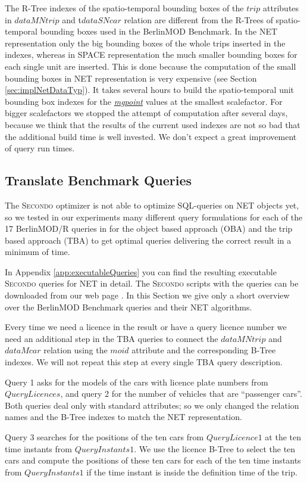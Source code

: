 \documentclass[a4paper]{article}
\newcommand{\secondo}{\textsc{Secondo}}
\newcommand{\bmodb} {BerlinMOD Benchmark}
\newcommand{\dt}[1]{\textsl{\underline{#1}}}
\begin{document}
The R-Tree indexes of the spatio-temporal bounding boxes of the $trip$ attributes
in $dataMNtrip$ and t$dataSNcar$ relation are different from the
R-Trees of spatio-temporal bounding boxes used in the \bmodb{}.
In the NET representation only the big bounding boxes of the whole trips inserted
in the indexes, whereas in SPACE  representation the much smaller bounding boxes
for each single unit are inserted. This is done because the computation of the
small bounding boxes in NET representation is very expensive (see Section
\ref{sec:implNetDataTyp}). It takes several hours to build the spatio-temporal
unit bounding box indexes for the \dt{mgpoint}  values at the smallest scalefactor.
For bigger scalefactors we stopped the attempt of computation after several days,
because we think that the results of the current used indexes are not so bad that
the additional build time is well invested. We don't expect a great improvement
of query run times.
\subsection{Translate Benchmark Queries}
\label{sec:queries}
The \secondo{} optimizer is not able to optimize SQL-queries on NET objects yet,
so we tested in our experiments many different query formulations for each of the
17 BerlinMOD/R queries in for the object based approach (OBA) and the trip based
approach (TBA) to get optimal queries delivering the correct result in a minimum of time.

In Appendix \ref{app:executableQueries} you can find the resulting executable
\secondo{} queries for NET in detail. The \secondo{} scripts with the queries
can be downloaded from our web page \cite{NetworkWeb}. In this Section we give
only a short overview over the \bmodb{} queries and their NET algorithms.

Every time we need a licence in the result or have a query licence number we need
an additional step in the TBA queries to connect the $dataMNtrip$ and $dataMcar$
relation using the $moid$ attribute and the corresponding B-Tree indexes.
We will not repeat this step at every single TBA query description.

Query 1 asks for the models of the cars with licence plate numbers from $QueryLicences$,
and query 2 for the number of vehicles that are ``passenger cars''. Both queries
deal only with standard attributes; so we only changed the relation names and the
B-Tree indexes to match the NET representation.

Query 3 searches for the positions of the ten cars from $QueryLicence1$ at the
ten time instants from $QueryInstants1$. We use the licence B-Tree to select the
ten cars and compute the positions of these ten cars for each of the ten time
instants from $QueryInstants1$ if the time instant is inside the definition time
of the trip.
\end{document}

